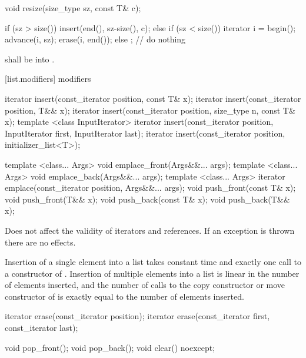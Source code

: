 %
\begin{itemdecl}
void resize(size_type sz, const T& c);
\end{itemdecl}

\begin{itemdescr}
\pnum
\effects
\begin{codeblock}
if (sz > size())
  insert(end(), sz-size(), c);
else if (sz < size()) {
  iterator i = begin();
  advance(i, sz);
  erase(i, end());
}
else
  ;                 // do nothing
\end{codeblock}

\pnum
\requires {} shall be  into .
\end{itemdescr}

[list.modifiers]{ modifiers}

%
\begin{itemdecl}
iterator insert(const_iterator position, const T& x);
iterator insert(const_iterator position, T&& x);
iterator insert(const_iterator position, size_type n, const T& x);
template <class InputIterator>
  iterator insert(const_iterator position, InputIterator first,
                  InputIterator last);
iterator insert(const_iterator position, initializer_list<T>);

template <class... Args> void emplace_front(Args&&... args);
template <class... Args> void emplace_back(Args&&... args);
template <class... Args> iterator emplace(const_iterator position, Args&&... args);
void push_front(const T& x);
void push_front(T&& x);
void push_back(const T& x);
void push_back(T&& x);
\end{itemdecl}

\begin{itemdescr}
\pnum
\notes
Does not affect the validity of iterators and references.
If an exception is thrown there are no effects.

\pnum
\complexity
Insertion of a single element into a list takes constant time and
exactly one call to a constructor of
. Insertion of multiple elements into a list is linear in the
number of elements inserted, and the number of calls to the copy
constructor or move constructor of  is exactly equal
to the number of elements inserted.
\end{itemdescr}

%
\begin{itemdecl}
iterator erase(const_iterator position);
iterator erase(const_iterator first, const_iterator last);

void pop_front();
void pop_back();
void clear() noexcept;
\end{itemdecl}

